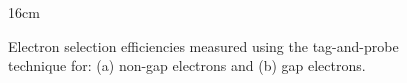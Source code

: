 \begin{figure}[hbtp]{16cm}
	\caption{Electron selection efficiencies measured using the tag-and-probe technique for: (a) non-gap electrons and (b) gap electrons.}
	\centering
	\label{fig:electron_selection_efficiency}
\end{figure}


